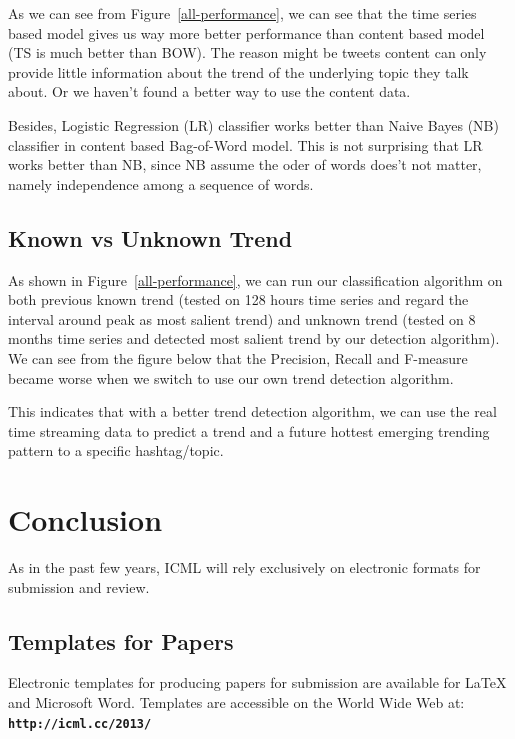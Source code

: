 \documentclass{article}
\begin{document}
As we can see from Figure~\ref{all-performance}, we can see that the time series based model gives us way more better performance than content based model (TS is much better than BOW). The reason might be tweets content can only provide little information about the trend of the underlying topic they talk about. Or we haven't found a better way to use the content data.

Besides, Logistic Regression (LR) classifier works better than Naive Bayes (NB) classifier in content based Bag-of-Word model. This is not surprising that LR works better than NB, since NB assume the oder of words does't not matter, namely independence among a sequence of words. 


\subsection{Known vs Unknown Trend}

As shown in Figure~\ref{all-performance}, we can run our classification algorithm on both previous known trend (tested on 128 hours time series and regard the interval around peak as most salient trend) and unknown trend (tested on 8 months time series and detected most salient trend by our detection algorithm). We can see from the figure below that the Precision, Recall and F-measure became worse when we switch to use our own trend detection algorithm. 

This indicates that with a better trend detection algorithm, we can use the real time streaming data to predict a trend and a future hottest emerging trending pattern to a specific hashtag/topic. 


\section{Conclusion} 




As in the past few years, ICML will rely exclusively on
electronic formats for submission and review. 


\subsection{Templates for Papers}

Electronic templates for producing papers for submission are available
for \LaTeX\/ and Microsoft Word. Templates are accessible on the World
Wide Web at:\\
\textbf{\texttt{http://icml.cc/2013/}}
\end{document}
